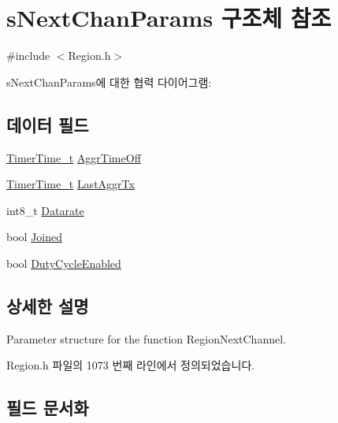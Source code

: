 \hypertarget{structs_next_chan_params}{}\section{s\+Next\+Chan\+Params 구조체 참조}
\label{structs_next_chan_params}


{\ttfamily \#include $<$Region.\+h$>$}



s\+Next\+Chan\+Params에 대한 협력 다이어그램\+:
\subsection*{데이터 필드}
\begin{DoxyCompactItemize}
\item 
\mbox{\hyperlink{utilities_8h_a4215ca43d3e953099ea758ce428599d0}{Timer\+Time\+\_\+t}} \mbox{\hyperlink{structs_next_chan_params_a3609676d2d3b7c00e25615324b35cb26}{Aggr\+Time\+Off}}
\item 
\mbox{\hyperlink{utilities_8h_a4215ca43d3e953099ea758ce428599d0}{Timer\+Time\+\_\+t}} \mbox{\hyperlink{structs_next_chan_params_a381b728f60b185ecf3313e974c18768b}{Last\+Aggr\+Tx}}
\item 
int8\+\_\+t \mbox{\hyperlink{structs_next_chan_params_ae2f6080f3aa0e9485c55513ca56bb24d}{Datarate}}
\item 
bool \mbox{\hyperlink{structs_next_chan_params_ac2f6caa0f3b02d2ac5056c3ee7c22652}{Joined}}
\item 
bool \mbox{\hyperlink{structs_next_chan_params_a4d755868e0e80089462286c3ba6a6f18}{Duty\+Cycle\+Enabled}}
\end{DoxyCompactItemize}


\subsection{상세한 설명}
Parameter structure for the function Region\+Next\+Channel. 

Region.\+h 파일의 1073 번째 라인에서 정의되었습니다.



\subsection{필드 문서화}
\mbox{\label{structs_next_chan_params_a3609676d2d3b7c00e25615324b35cb26}} 
